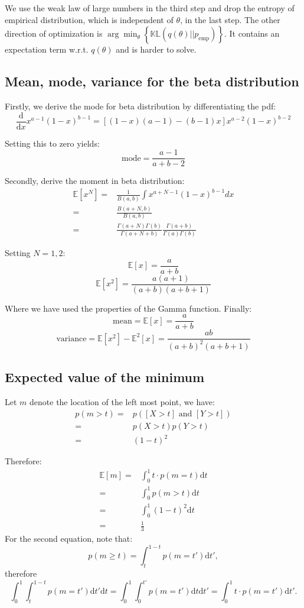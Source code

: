 \documentclass[UTF8]{ctexart}
\begin{document}
We use the weak law of large numbers in the third step and drop the entropy of empirical distribution, which is independent of $\theta$, in the last step.
The other direction of optimization is $\arg\min_{\theta}\left\{\mathbb{KL}(q(\theta)||p_{\text{emp}}) \right\}$.
It contains an expectation term w.r.t. $q(\theta)$ and is harder to solve.

\subsection{Mean, mode, variance for the beta distribution}
Firstly, we derive the mode for beta distribution by differentiating the pdf:
$$\frac{\text{d}}{\text{d}x}x^{a-1}(1-x)^{b-1}=[(1-x)(a-1)-(b-1)x]x^{a-2}(1-x)^{b-2}$$

Setting this to zero yields:
$$\text{mode}=\frac{a-1}{a+b-2}$$

Secondly, derive the moment in beta distribution:
\begin{align}
\mathbb{E}[x^{N}]=&\frac{1}{B(a,b)}\int x^{a+N-1}(1-x)^{b-1} dx \nonumber \\
=&\frac{B(a+N,b)}{B(a,b)} \nonumber \\
=&\frac{\Gamma(a+N)\Gamma(b)}{\Gamma(a+N+b)} \frac{\Gamma(a+b)}{\Gamma(a)\Gamma(b)} \nonumber
\end{align}

Setting $N=1,2$:
$$\mathbb{E}[x]=\frac{a}{a+b}$$
$$\mathbb{E}[x^{2}]=\frac{a(a+1)}{(a+b)(a+b+1)}$$

Where we have used the properties of the Gamma function.
Finally:
$$\text{mean}=\mathbb{E}[x]=\frac{a}{a+b}$$
$$\text{variance}=\mathbb{E}[x^{2}]-\mathbb{E}^{2}[x]=\frac{ab}{(a+b)^{2}(a+b+1)}$$

\subsection{Expected value of the minimum}
Let $m$ denote the location of the left most point, we have:
\begin{align}
p(m>t)=&p([X>t] \text{ and } [Y>t])\nonumber \\
=&p(X>t)p(Y>t) \nonumber \\
=&(1-t)^{2} \nonumber
\end{align}

Therefore:
\begin{align}
\mathbb{E}[m]=&\int_{0}^{1} t\cdot p(m=t)\text{d}t \nonumber \\
=&\int_{0}^{1} p(m>t)\text{d}t \nonumber \\
=&\int_{0}^{1}(1-t)^{2}\text{d}t \nonumber \\
=&\frac{1}{3}\nonumber
\end{align}
For the second equation, note that:
$$p(m\geq t)=\int_{t}^{1-t}p(m=t')\text{d}t',$$
therefore
$$\int_{0}^{1}\int_{t}^{1-t}p(m=t')\text{d}t'\text{d}t=\int_{0}^{1}\int_{0}^{t'}p(m=t')\text{d}t\text{d}t'=\int_{0}^{1}t\cdot p(m=t')\text{d}t'.$$
\end{document}
